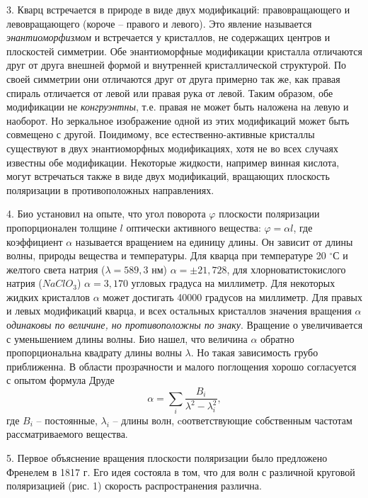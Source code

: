 \documentclass[14pt]{article}
\begin{document}
3. Кварц встречается в природе в виде двух модификаций: правовращающего и левовращающего (короче -- правого и левого). Это явление называется \textsl{энантиоморфизмом} и встречается у кристаллов, не содержащих центров и плоскостей симметрии. Обе энантиоморфные модификации кристалла отличаются друг от друга внешней формой и внутренней кристаллической
структурой. По своей симметрии они отличаются друг от друга примерно так же, как правая спираль отличается от левой или правая рука от левой. Таким образом, обе модификации не \textsl{конгруэнтны}, т.е. правая не может быть наложена на левую и наоборот. Но зеркальное изображение одной из этих модификаций может быть совмещено с другой. Поидимому, все естественно-активные кристаллы существуют в двух энантиоморфных модификациях, хотя не во всех случаях известны обе модификации. Некоторые жидкости, например винная кислота, могут встречаться также в виде двух модификаций, вращающих плоскость поляризации в противоположных направлениях.

4. Био установил на опыте, что угол поворота $\varphi$ плоскости поляризации пропорционален толщине $l$ оптически активного вещества: $\varphi = \alpha l$, где коэффициент 
$\alpha$ называется вращением на единицу длины. Он зависит от длины волны, природы вещества и температуры. Для кварца при температуре 20 $^\circ$С и желтого света натрия 
($\lambda = 589,3$ нм) $\alpha = \pm21,728$, для хлорноватистокислого натрия ($NaClO_3$) $\alpha = 3,170$ угловых градуса на миллиметр. Для некоторых жидких кристаллов 
$\alpha$ может достигать 40000 градусов на миллиметр. Для правых и левых модификаций кварца, и всех остальных кристаллов значения вращения $\alpha$ о\textsl{динаковы по величине, но противоположны по знаку}. Вращение о увеличивается с уменьшением длины волны. Био нашел, что величина $\alpha$ обратно пропорциональна квадрату длины волны 
$\lambda$. Но такая зависимость грубо приближенна. В области прозрачности и малого поглощения хорошо согласуется с опытом формула Друде
$$
	\alpha = \sum_i \frac{B_i}{\lambda^2 - \lambda_i^2},
$$
где $B_i$ -- постоянные, $\lambda_i$ -- длины волн, cоответствующие собственным частотам рассматриваемого вещества. 

5. Первое объяснение вращения плоскости поляризации было предложено Френелем в 1817 г. Его идея состояла в том, что для волн с различной круговой поляризацией (рис. 1) скорость распространения различна.
\end{document}

